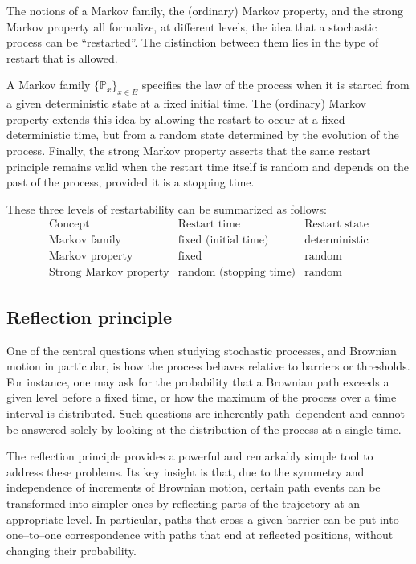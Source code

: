 \begin{remark}
The notions of a Markov family, the (ordinary) Markov property, and the strong Markov
property all formalize, at different levels, the idea that a stochastic process can be
``restarted''. The distinction between them lies in the type of restart that is allowed.

A Markov family $\{\mathbb P_x\}_{x\in E}$ specifies the law of the process when it is
started from a given deterministic state at a fixed initial time. The (ordinary) Markov
property extends this idea by allowing the restart to occur at a fixed deterministic time,
but from a random state determined by the evolution of the process. Finally, the strong
Markov property asserts that the same restart principle remains valid when the restart
time itself is random and depends on the past of the process, provided it is a stopping
time.

\medskip
\noindent
These three levels of restartability can be summarized as follows:
\[
\begin{array}{c|c|c}
\text{Concept} & \text{Restart time} & \text{Restart state} \\ \hline
\text{Markov family} & \text{fixed (initial time)} & \text{deterministic} \\
\text{Markov property} & \text{fixed} & \text{random} \\
\text{Strong Markov property} & \text{random (stopping time)} & \text{random}
\end{array}
\]
\end{remark}


\subsection{Reflection principle}

One of the central questions when studying stochastic processes, and Brownian motion in
particular, is how the process behaves relative to barriers or thresholds. For instance,
one may ask for the probability that a Brownian path exceeds a given level before a fixed
time, or how the maximum of the process over a time interval is distributed. Such
questions are inherently path--dependent and cannot be answered solely by looking at the
distribution of the process at a single time.

The reflection principle provides a powerful and remarkably simple tool to address these
problems. Its key insight is that, due to the symmetry and independence of increments of
Brownian motion, certain path events can be transformed into simpler ones by reflecting
parts of the trajectory at an appropriate level. In particular, paths that cross a given
barrier can be put into one--to--one correspondence with paths that end at reflected
positions, without changing their probability.

